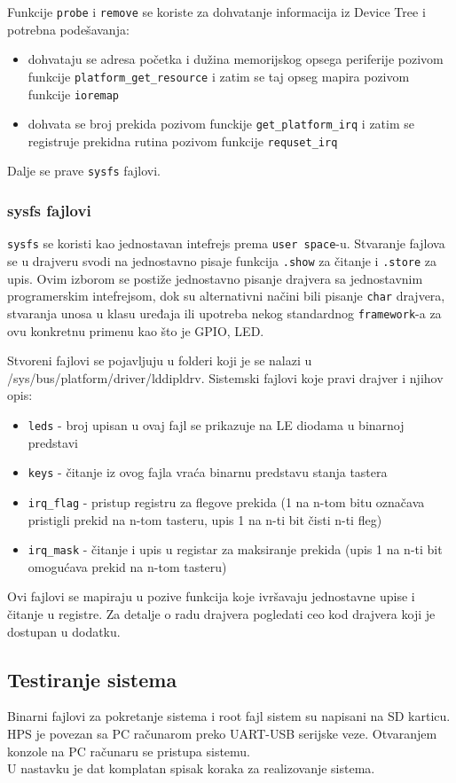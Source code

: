 Funkcije \texttt{probe} i \texttt{remove} se koriste za dohvatanje informacija iz Device Tree i potrebna podešavanja:
\begin{itemize}
\item dohvataju se adresa početka i dužina memorijskog opsega periferije pozivom funkcije \texttt{platform_get_resource} i zatim se taj opseg mapira pozivom funkcije \texttt{ioremap}
\item dohvata se broj prekida pozivom funckije \texttt{get_platform_irq} i zatim se registruje prekidna rutina pozivom funkcije \texttt{requset_irq}
\end{itemize}

Dalje se prave \texttt{sysfs} fajlovi.

\subsubsection*{sysfs fajlovi}
\texttt{sysfs} se koristi kao jednostavan intefrejs prema \texttt{user space}-u. Stvaranje fajlova se u drajveru svodi na jednostavno pisaje funkcija \texttt{.show} za čitanje i \texttt{.store} za upis. Ovim izborom se postiže jednostavno pisanje drajvera sa jednostavnim programerskim intefrejsom, dok su alternativni načini bili pisanje \texttt{char} drajvera, stvaranja unosa u klasu uređaja ili upotreba nekog standardnog \texttt{framework}-a za ovu konkretnu primenu kao što je GPIO, LED.

Stvoreni fajlovi se pojavljuju u folderi koji je se nalazi u {/sys/bus/platform/driver/lddipldrv}. Sistemski fajlovi koje pravi drajver i njihov opis:
\begin{itemize}
\item \texttt{leds} - broj upisan u ovaj fajl se prikazuje na LE diodama u binarnoj predstavi
\item \texttt{keys} - čitanje iz ovog fajla vraća binarnu predstavu stanja tastera
\item \texttt{irq\_flag} - pristup registru za flegove prekida (1 na n-tom bitu označava pristigli prekid na n-tom tasteru, upis 1 na n-ti bit čisti n-ti fleg)
\item \texttt{irq\_mask} - čitanje i upis u registar za maksiranje prekida (upis 1 na n-ti bit omogućava prekid na n-tom tasteru)
\end{itemize}

Ovi fajlovi se mapiraju u pozive funkcija koje ivršavaju jednostavne upise i čitanje u registre. Za detalje o radu drajvera pogledati ceo kod drajvera koji je dostupan u dodatku.
\subsection*{Testiranje sistema}
Binarni fajlovi za pokretanje sistema i root fajl sistem su napisani na SD karticu. HPS je povezan sa PC računarom preko UART-USB serijske veze. Otvaranjem konzole na PC računaru se pristupa sistemu.\\
U nastavku je dat komplatan spisak koraka za realizovanje sistema.



